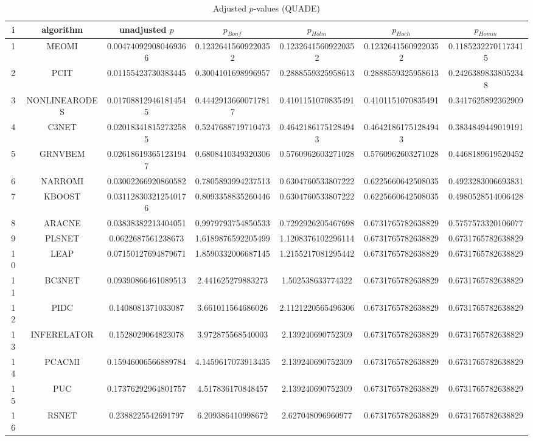 \documentclass[a4paper,10pt]{article}
\begin{document}
\begin{landscape}
\begin{table}[!htp]
\centering\scriptsize
\caption{Adjusted $p$-values (QUADE)}
\begin{tabular}{ccccccc}
i&algorithm&unadjusted $p$&$p_{Bonf}$&$p_{Holm}$&$p_{Hoch}$&$p_{Homm}$\\
\hline
1&MEOMI&0.004740929080469366&0.12326415609220352&0.12326415609220352&0.12326415609220352&0.11852322701173415\\
2&PCIT&0.01155423730383445&0.3004101698996957&0.2888559325958613&0.2888559325958613&0.24263898338052348\\
3&NONLINEARODES&0.017088129461814545&0.44429136600717817&0.4101151070835491&0.4101151070835491&0.3417625892362909\\
4&C3NET&0.020183418152732585&0.5247688719710473&0.46421861751284943&0.46421861751284943&0.3834849449019191\\
5&GRNVBEM&0.026186193651231947&0.6808410349320306&0.5760962603271028&0.5760962603271028&0.4468189619520452\\
6&NARROMI&0.03002266920860582&0.7805893994237513&0.6304760533807222&0.6225660642508035&0.4923283006693831\\
7&KBOOST&0.031128303212540176&0.8093358835260446&0.6304760533807222&0.6225660642508035&0.4980528514006428\\
8&ARACNE&0.03838382213404051&0.9979793754850533&0.7292926205467698&0.6731765782638829&0.5757573320106077\\
9&PLSNET&0.0622687561238673&1.6189876592205499&1.1208376102296114&0.6731765782638829&0.6731765782638829\\
10&LEAP&0.07150127694879671&1.8590332006687145&1.2155217081295442&0.6731765782638829&0.6731765782638829\\
11&BC3NET&0.09390866461089513&2.441625279883273&1.502538633774322&0.6731765782638829&0.6731765782638829\\
12&PIDC&0.1408081371033087&3.661011564686026&2.1121220565496306&0.6731765782638829&0.6731765782638829\\
13&INFERELATOR&0.1528029064823078&3.972875568540003&2.139240690752309&0.6731765782638829&0.6731765782638829\\
14&PCACMI&0.15946006566889784&4.1459617073913435&2.139240690752309&0.6731765782638829&0.6731765782638829\\
15&PUC&0.17376292964801757&4.517836170848457&2.139240690752309&0.6731765782638829&0.6731765782638829\\
16&RSNET&0.2388225542691797&6.209386410998672&2.627048096960977&0.6731765782638829&0.6731765782638829\\

\end{tabular}
\end{table}
\end{landscape}
\end{document}
